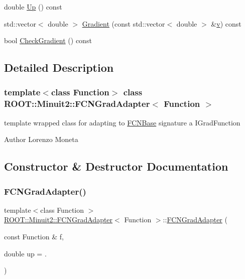 \begin{DoxyCompactItemize}
\item 
double \mbox{\hyperlink{classROOT_1_1Minuit2_1_1FCNGradAdapter_a99e41f07b3f7374c0b17ef42f1c15a19}{Up}} () const
\item 
std\+::vector$<$ double $>$ \mbox{\hyperlink{classROOT_1_1Minuit2_1_1FCNGradAdapter_ae91d0453fd5e953f75551576659d6c7b}{Gradient}} (const std\+::vector$<$ double $>$ \&\mbox{\hyperlink{hadron__timeslice_8cc_a716fc87f5e814be3ceee2405ed6ff22a}{v}}) const
\item 
bool \mbox{\hyperlink{classROOT_1_1Minuit2_1_1FCNGradAdapter_a10faf0c868284a440f291465b7efd08e}{Check\+Gradient}} () const
\end{DoxyCompactItemize}


\subsection{Detailed Description}
\subsubsection*{template$<$class Function$>$\newline
class R\+O\+O\+T\+::\+Minuit2\+::\+F\+C\+N\+Grad\+Adapter$<$ Function $>$}

template wrapped class for adapting to \mbox{\hyperlink{classROOT_1_1Minuit2_1_1FCNBase}{F\+C\+N\+Base}} signature a I\+Grad\+Function

\begin{DoxyAuthor}{Author}
Lorenzo Moneta 
\end{DoxyAuthor}


\subsection{Constructor \& Destructor Documentation}
\mbox{\label{classROOT_1_1Minuit2_1_1FCNGradAdapter_a1836db737b7f09a9acc99b9206abed81}} 
\subsubsection{\texorpdfstring{FCNGradAdapter()}{FCNGradAdapter()}\hspace{0.1cm}{\footnotesize\ttfamily [1/2]}}
{\footnotesize\ttfamily template$<$class Function $>$ \\
\mbox{\hyperlink{classROOT_1_1Minuit2_1_1FCNGradAdapter}{R\+O\+O\+T\+::\+Minuit2\+::\+F\+C\+N\+Grad\+Adapter}}$<$ Function $>$\+::\mbox{\hyperlink{classROOT_1_1Minuit2_1_1FCNGradAdapter}{F\+C\+N\+Grad\+Adapter}} (\begin{DoxyParamCaption}\item[{const Function \&}]{f,  }\item[{double}]{up = {.} }\end{DoxyParamCaption})\hspace{0.3cm}{\ttfamily [inline]}}

